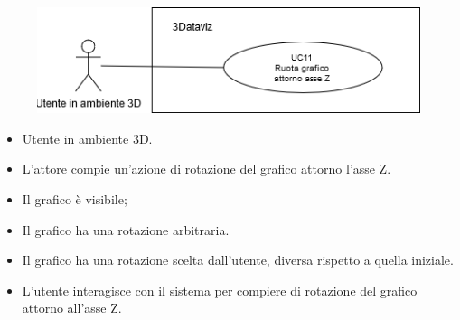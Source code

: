 \begin{figure}[h!]
    \centering
    \includegraphics[scale=0.65]{template/images/UC11.png}
    \caption{}
\end{figure}
\UCdsc
{ %
    \begin{itemize}
        \item Utente in ambiente 3D.
    \end{itemize}
}
{ %
    \begin{itemize}
        \item L'attore compie un'azione di rotazione del grafico attorno l'asse Z.
    \end{itemize}
}
{ %
    \begin{itemize}
        \item Il grafico è visibile;
        \item Il grafico ha una rotazione arbitraria.
    \end{itemize}
}
{ %
    \begin{itemize}
        \item Il grafico ha una rotazione scelta dall'utente, diversa rispetto a quella iniziale.
    \end{itemize}
}
{ %
    \begin{itemize}
        \item L'utente interagisce con il sistema per compiere di rotazione del grafico attorno all'asse Z.
    \end{itemize}
}
    

